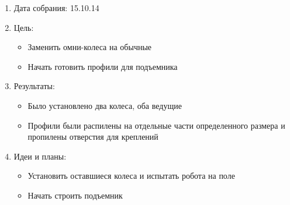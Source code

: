 \documentclass[11pt]{article}
\begin{document}
	\begin{enumerate}
	\item Дата собрания: 15.10.14
	\item Цель:
		\begin{itemize}
		\item Заменить омни-колеса на обычные
		\item Начать готовить профили для подъемника
		\end{itemize}
	\item Результаты:
		\begin{itemize}
		\item Было установлено два колеса, оба ведущие
		\item Профили были распилены на отдельные части определенного размера и пропилены отверстия для креплений
		\end{itemize}
	\item Идеи и планы:
		\begin{itemize}
		\item Установить оставшиеся колеса и испытать робота на поле
		\item Начать строить подъемник
		\end{itemize}
	\end{enumerate}
\end{document}
